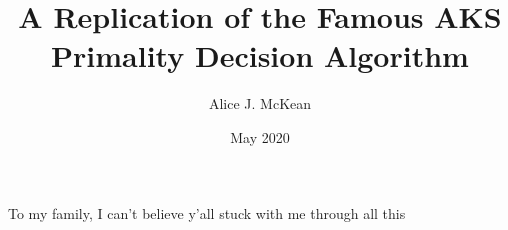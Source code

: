 \documentclass[12pt,twoside]{reedthesis}
\title{A Replication of the Famous AKS Primality Decision Algorithm}
\author{Alice J. McKean}
\date{May 2020}
\newenvironment{dedication}{
  \begin{center}
    \thispagestyle{empty}
    \vspace*{\fill}
}{
    \vspace*{\fill}
  \end{center}
}
\begin{document}
\maketitle
\frontmatter
\pagestyle{empty}

\mainmatter
\pagestyle{fancyplain}

\begin{dedication}
  To my family, I can't believe y'all stuck with me through all this
\end{dedication}

\tableofcontents









\appendix

\backmatter

\nocite{gnu-parallel}


\end{document}
